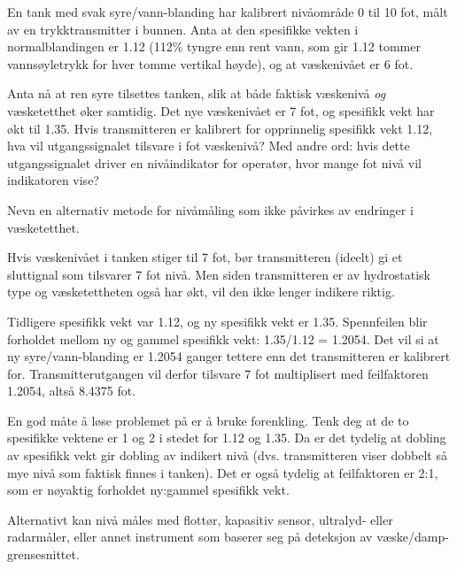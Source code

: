 

En tank med svak syre/vann-blanding har kalibrert nivåområde 0 til 10 fot, målt av en trykktransmitter i bunnen.  Anta at den spesifikke vekten i normalblandingen er 1.12 (112\% tyngre enn rent vann, som gir 1.12 tommer vannsøyletrykk for hver tomme vertikal høyde), og at væskenivået er 6 fot.

Anta nå at ren syre tilsettes tanken, slik at både faktisk væskenivå {\it og} væsketetthet øker samtidig.  Det nye væskenivået er 7 fot, og spesifikk vekt har økt til 1.35.  Hvis transmitteren er kalibrert for opprinnelig spesifikk vekt 1.12, hva vil utgangssignalet tilsvare i fot væskenivå?  Med andre ord: hvis dette utgangssignalet driver en nivåindikator for operatør, hvor mange fot nivå vil indikatoren vise?

\vskip 10pt

Nevn en alternativ metode for nivåmåling som ikke påvirkes av endringer i væsketetthet.







Hvis væskenivået i tanken stiger til 7 fot, bør transmitteren (ideelt) gi et sluttignal som tilsvarer 7 fot nivå.  Men siden transmitteren er av hydrostatisk type og væsketettheten også har økt, vil den ikke lenger indikere riktig.

Tidligere spesifikk vekt var 1.12, og ny spesifikk vekt er 1.35.  Spennfeilen blir forholdet mellom ny og gammel spesifikk vekt: 1.35/1.12 = 1.2054.  Det vil si at ny syre/vann-blanding er 1.2054 ganger tettere enn det transmitteren er kalibrert for.  Transmitterutgangen vil derfor tilsvare 7 fot multiplisert med feilfaktoren 1.2054, altså 8.4375 fot.

\vskip 10pt

En god måte å løse problemet på er å bruke forenkling.  Tenk deg at de to spesifikke vektene er 1 og 2 i stedet for 1.12 og 1.35.  Da er det tydelig at dobling av spesifikk vekt gir dobling av indikert nivå (dvs. transmitteren viser dobbelt så mye nivå som faktisk finnes i tanken).  Det er også tydelig at feilfaktoren er 2:1, som er nøyaktig forholdet ny:gammel spesifikk vekt.

\vskip 10pt

Alternativt kan nivå måles med flottør, kapasitiv sensor, ultralyd- eller radarmåler, eller annet instrument som baserer seg på deteksjon av væske/damp-grensesnittet.









